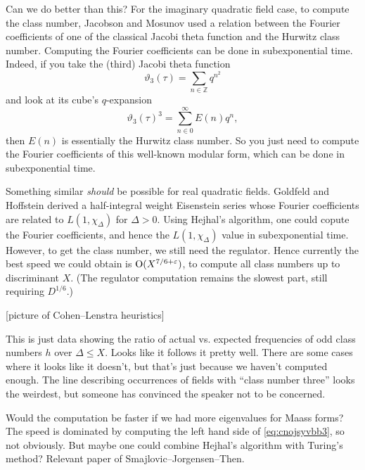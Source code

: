 \documentclass[reqno]{amsart} 
\begin{document}
Can we do better than this?  For the imaginary quadratic field case, to compute the class number, Jacobson and Mosunov used a relation between the Fourier coefficients of one of the classical Jacobi theta function and the Hurwitz class number.  Computing the Fourier coefficients can be done in subexponential time.  Indeed, if you take the (third) Jacobi theta function
\begin{equation*}
  \vartheta_3(\tau) = \sum_{n \in \mathbb{Z}} q^{n^2}
\end{equation*}
and look at its cube's $q$-expansion
\begin{equation*}
  \vartheta_3(\tau)^3 = \sum_{n \in 0}^\infty E(n) q^n,
\end{equation*}
then $E(n)$ is essentially the Hurwitz class number.  So you just need to compute the Fourier coefficients of this well-known modular form, which can be done in subexponential time.

Something similar \emph{should} be possible for real quadratic fields.  Goldfeld and Hoffstein \cite{MR788407} derived a half-integral weight Eisenstein series whose Fourier coefficients are related to $L(1, \chi_{\Delta})$ for $\Delta > 0$.  Using Hejhal's algorithm, one could copute the Fourier coefficients, and hence the $L(1, \chi_\Delta)$ value in subexponential time.  However, to get the class number, we still need the regulator.  Hence currently the best speed we could obtain is $\operatorname{O}(X^{7/6 + \varepsilon})$, to compute all class numbers up to discriminant $X$.  (The regulator computation remains the slowest part, still requiring $D^{1/6}$.)

[picture of Cohen--Lenstra heuristics]

This is just data showing the ratio of actual vs. expected frequencies of odd class numbers $h$ over $\Delta \leq X$.  Looks like it follows it pretty well.  There are some cases where it looks like it doesn't, but that's just because we haven't computed enough.  The line describing occurrences of fields with ``class number three'' looks the weirdest, but someone has convinced the speaker not to be concerned.

Would the computation be faster if we had more eigenvalues for Maass forms?  The speed is dominated by computing the left hand side of \eqref{eq:cnojsyvbb3}, so not obviously.  But maybe one could combine Hejhal's algorithm with Turing's method?  Relevant paper of Smajlovic--Jorgensen--Then.
{} 
\end{document}
